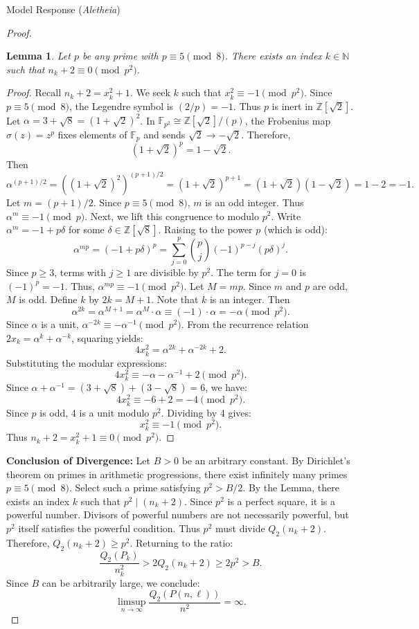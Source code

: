 \documentclass[11pt]{article}
\newcommand{\N}{\mathbb{N}}
\newcommand{\Qtwo}{Q_2}
\newcommand{\Z}{\mathbb{Z}}
\newcommand{\F}{\mathbb{F}}
\newtheorem{lemma}{Lemma}
\begin{document}
\begin{solution}{Model Response (\emph{Aletheia})}
\begin{proof}
\begin{lemma}
Let $p$ be any prime with $p \equiv 5 \pmod 8$. There exists an index $k \in \N$ such that $n_k + 2 \equiv 0 \pmod{p^2}$.
\end{lemma}
\begin{proof}
Recall $n_k+2 = x_k^2+1$. We seek $k$ such that $x_k^2 \equiv -1 \pmod{p^2}$.
Since $p \equiv 5 \pmod 8$, the Legendre symbol is $(2/p) = -1$. Thus $p$ is inert in $\Z[\sqrt{2}]$.
Let $\alpha = 3 + \sqrt{8} = (1+\sqrt{2})^2$.
In $\F_{p^2} \cong \Z[\sqrt{2}]/(p)$, the Frobenius map $\sigma(z) = z^p$ fixes elements of $\F_p$ and sends $\sqrt{2} \to -\sqrt{2}$.
Therefore,
\[ (1+\sqrt{2})^p = 1 - \sqrt{2}. \]
Then
\[ \alpha^{(p+1)/2} = \left((1+\sqrt{2})^2\right)^{(p+1)/2} = (1+\sqrt{2})^{p+1} = (1+\sqrt{2})(1-\sqrt{2}) = 1 - 2 = -1. \]
Let $m = (p+1)/2$. Since $p \equiv 5 \pmod 8$, $m$ is an odd integer.
Thus $\alpha^m \equiv -1 \pmod p$.
Next, we lift this congruence to modulo $p^2$. Write $\alpha^m = -1 + p\delta$ for some $\delta \in \Z[\sqrt{8}]$.
Raising to the power $p$ (which is odd):
\[ \alpha^{mp} = (-1 + p\delta)^p = \sum_{j=0}^p \binom{p}{j}(-1)^{p-j}(p\delta)^j. \]
Since $p \ge 3$, terms with $j \ge 1$ are divisible by $p^2$. The term for $j=0$ is $(-1)^p = -1$.
Thus, $\alpha^{mp} \equiv -1 \pmod{p^2}$.
Let $M = mp$. Since $m$ and $p$ are odd, $M$ is odd.
Define $k$ by $2k = M+1$. Note that $k$ is an integer.
Then
\[ \alpha^{2k} = \alpha^{M+1} = \alpha^M \cdot \alpha \equiv (-1) \cdot \alpha = -\alpha \pmod{p^2}. \]
Since $\alpha$ is a unit, $\alpha^{-2k} \equiv -\alpha^{-1} \pmod{p^2}$.
From the recurrence relation $2x_k = \alpha^k + \alpha^{-k}$, squaring yields:
\[ 4x_k^2 = \alpha^{2k} + \alpha^{-2k} + 2. \]
Substituting the modular expressions:
\[ 4x_k^2 \equiv -\alpha - \alpha^{-1} + 2 \pmod{p^2}. \]
Since $\alpha + \alpha^{-1} = (3+\sqrt{8}) + (3-\sqrt{8}) = 6$, we have:
\[ 4x_k^2 \equiv -6 + 2 = -4 \pmod{p^2}. \]
Since $p$ is odd, 4 is a unit modulo $p^2$. Dividing by 4 gives:
\[ x_k^2 \equiv -1 \pmod{p^2}. \]
Thus $n_k+2 = x_k^2+1 \equiv 0 \pmod{p^2}$.
\end{proof}

\textbf{Conclusion of Divergence:}
Let $B > 0$ be an arbitrary constant. By Dirichlet's theorem on primes in arithmetic progressions, there exist infinitely many primes $p \equiv 5 \pmod 8$. Select such a prime satisfying $p^2 > B/2$.
By the Lemma, there exists an index $k$ such that $p^2 \mid (n_k+2)$.
Since $p^2$ is a perfect square, it is a powerful number. Divisors of powerful numbers are not necessarily powerful, but $p^2$ itself satisfies the powerful condition. Thus $p^2$ must divide $\Qtwo(n_k+2)$.
Therefore, $\Qtwo(n_k+2) \ge p^2$.
Returning to the ratio:
\[ \frac{\Qtwo(P_k)}{n_k^2} > 2 \Qtwo(n_k+2) \ge 2p^2 > B. \]
Since $B$ can be arbitrarily large, we conclude:
\[ \limsup_{n \to \infty} \frac{\Qtwo(P(n, \ell))}{n^2} = \infty. \]
\end{proof}


\end{solution}
\end{document}
